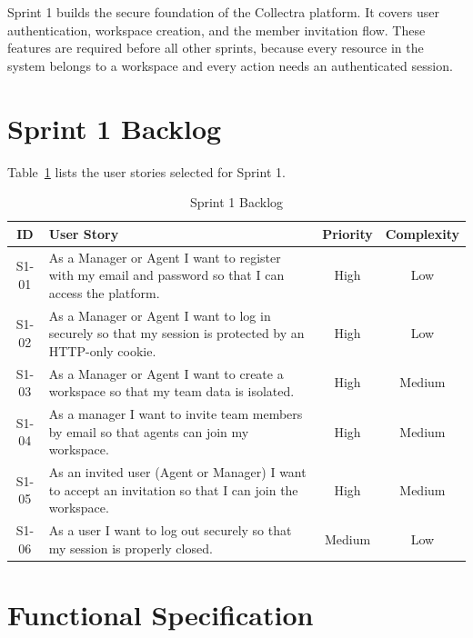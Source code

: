 \documentclass[12pt,a4paper]{report}
\begin{document}
Sprint 1 builds the secure foundation of the Collectra platform.
It covers user authentication, workspace creation, and the member invitation flow.
These features are required before all other sprints, because every resource in the
system belongs to a workspace and every action needs an authenticated session.

\section{Sprint 1 Backlog}

Table~\ref{tab:s1-backlog} lists the user stories selected for Sprint 1.

\begin{table}[H]
  \centering
  \renewcommand{\arraystretch}{1.3}
  \begin{tabular}{|c|p{8cm}|c|c|}
    \hline
    \textbf{ID} & \textbf{User Story} & \textbf{Priority} & \textbf{Complexity} \\
    \hline
    S1-01 & As a Manager or Agent I want to register with my email and password so that I can access the platform.         & High & Low \\
    \hline
    S1-02 & As a Manager or Agent I want to log in securely so that my session is protected by an HTTP-only cookie.        & High & Low \\
    \hline
    S1-03 & As a Manager or Agent I want to create a workspace so that my team data is isolated.              & High & Medium \\
    \hline
    S1-04 & As a manager I want to invite team members by email so that agents can join my workspace.          & High & Medium \\
    \hline
    S1-05 & As an invited user (Agent or Manager) I want to accept an invitation so that I can join the workspace.               & High & Medium \\
    \hline
    S1-06 & As a user I want to log out securely so that my session is properly closed.                        & Medium & Low \\
    \hline
  \end{tabular}
  \caption{Sprint 1 Backlog}
  \label{tab:s1-backlog}
\end{table}

\section{Functional Specification}
\end{document}
